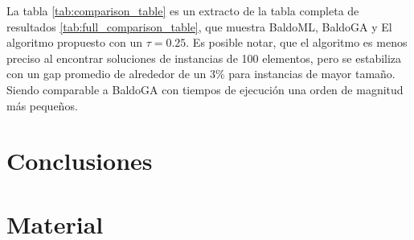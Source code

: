\documentclass[spanish, a4paper, 12pt, openany,final]{book}
\begin{document}
La tabla \ref{tab:comparison_table} es un extracto de la tabla completa de resultados \ref{tab:full_comparison_table}, que muestra BaldoML, BaldoGA y El algoritmo propuesto con un $\tau=0.25$. Es posible notar, que el algoritmo es menos preciso al encontrar soluciones de instancias de 100 elementos, pero se estabiliza con un gap promedio de alrededor de un 3\% para instancias de mayor tamaño. Siendo comparable a BaldoGA con tiempos de ejecución una orden de magnitud más pequeños.



\chapter{Conclusiones}
    
    
\clearpage

\newpage
\renewcommand\refname{Referencias}          %
{                           %
}

\newpage
\renewcommand{\appendixpagename}{Apéndices}     %

\appendix   %

\chapter{Material}
\end{document}
